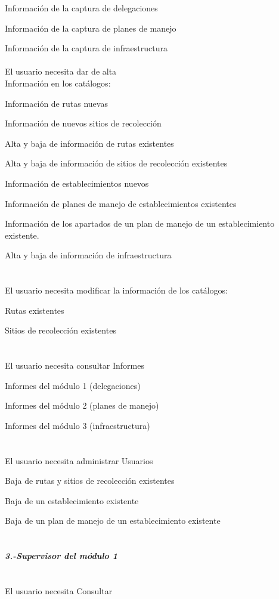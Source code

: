 \textbullet Información de la captura de delegaciones

\textbullet Información de la captura de planes de manejo

\textbullet Información de la captura de infraestructura\\\\
\textbullet El usuario necesita dar de alta\\

\textbullet Información en los catálogos:

\textbullet Información de rutas nuevas

\textbullet Información de nuevos sitios de recolección

\textbullet Alta y baja de información de rutas existentes

\textbullet Alta y baja de información de sitios de recolección existentes

\textbullet Información de establecimientos nuevos

\textbullet Información de planes de manejo de establecimientos existentes

\textbullet Información de los apartados de un plan de manejo de un establecimiento existente.

\textbullet Alta y baja de información de infraestructura\\\\\\
\textbullet El usuario necesita modificar  la información de los catálogos:

\textbullet Rutas existentes

\textbullet Sitios de recolección existentes\\\\\\
\textbullet El usuario necesita consultar Informes

\textbullet Informes del módulo 1 (delegaciones)

\textbullet Informes del módulo 2 (planes de manejo)

\textbullet Informes del módulo 3 (infraestructura)\\\\\\
\textbullet El usuario necesita administrar
Usuarios

\textbullet Baja de rutas y sitios de recolección existentes

\textbullet Baja de un establecimiento existente

\textbullet Baja de un plan de manejo de un establecimiento existente\\\\\\
{\large \textit{\textbf{3.-Supervisor del módulo 1}}}\\\\\\
\textbullet El usuario necesita Consultar \\

